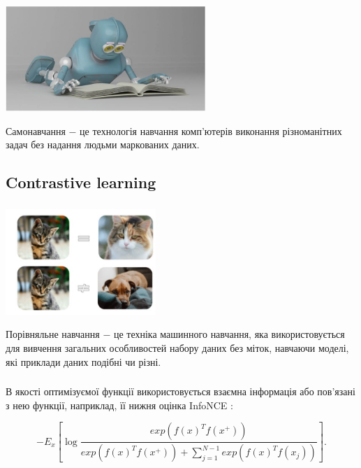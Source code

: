 \documentclass[c]{beamer}
\begin{document}
\begin{frame}
	\frametitle{\insertsection}
	\frametitle{\insertsubsection}
	
  	\includegraphics[width=\textwidth, height=4cm, natwidth=850, natheight=450]{self_supervised.jpg}

	Самонавчання $-$ це технологія навчання комп'ютерів виконання різноманітних задач без надання людьми маркованих даних.
\end{frame}

\subsection{Contrastive learning}

\begin{frame}
	\frametitle{\insertsection}
	\frametitle{\insertsubsection}
	
  	\includegraphics[width=\textwidth, height=4cm, natwidth=497, natheight=349]{contrastive.jpg}

	Порівняльне навчання $-$ це техніка машинного навчання, яка використовується для вивчення загальних особливостей набору даних без міток, навчаючи моделі, які приклади даних подібні чи різні.
\end{frame}


\begin{frame}
	\frametitle{\insertsection}
	\frametitle{\insertsubsection}
	
	В якості оптимізуємої функції використовується взаємна інформація або пов'язані з нею функції, наприклад, її нижня оцінка InfoNCE :

\begin{equation*}\label{eq:infonce}
-E_{x}\left[ \log{\frac{exp(f(x)^{T}f(x^{+}))}{exp(f(x)^{T}f(x^{+}))+\sum_{j=1}^{N-1}exp(f(x)^{T}f(x_{j}))}} \right].
\end{equation*}

\end{frame}
\end{document}
